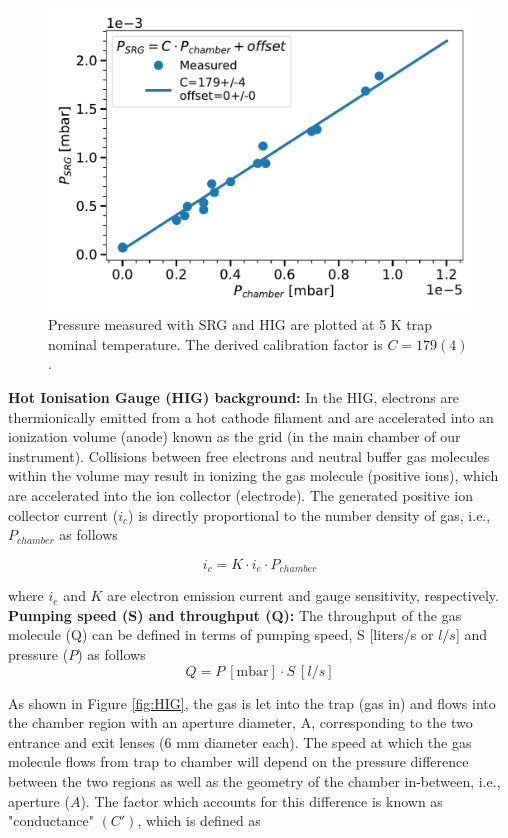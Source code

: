 \begin{figure}[!htb]
    \centering
    \includegraphics[scale=0.5]{figures/Instruments/SRG_calibration_5K.pdf}
    \caption{Pressure measured with SRG and HIG are plotted at 5 K trap nominal temperature. The derived calibration factor is $C=179(4)$.}
    \label{fig:srg-calibration-5K}
\end{figure}

\textbf{Hot Ionisation Gauge (HIG) background:} In the HIG, electrons are thermionically emitted from a hot cathode filament and  are accelerated into an ionization volume (anode) known as the grid (in the main chamber of our instrument). Collisions between free electrons and neutral buffer gas molecules within the volume may result in ionizing the gas molecule (positive ions), which are accelerated into the ion collector (electrode). The generated positive ion collector current ($i_c$) is directly proportional to the number density of gas, i.e., $P_{chamber}$ as follows

\[ i_c = K \cdot i_e \cdot P_{chamber} \]

where $i_e$ and $K$ are electron emission current and gauge sensitivity,
respectively.\\

\textbf{Pumping speed (S) and throughput (Q):} The throughput of the gas molecule (Q) can be defined in terms of pumping speed, S [liters/s or $l/s$]  and pressure ($P$) as follows
\[ Q = P \ [\text{mbar}] \cdot  S\ [l/s] \]

As shown in Figure \ref{fig:HIG}, the gas is let into the trap (gas in) and
flows into the chamber region with an aperture diameter, A, corresponding to
the two entrance and exit lenses (6 mm diameter each). The speed at which the
gas molecule flows from trap to chamber will depend on the pressure difference
between the two regions as well as the geometry of the chamber in-between,
i.e., aperture ($A$). The factor which accounts for this difference is known as
"conductance" $(C')$, which is defined as

